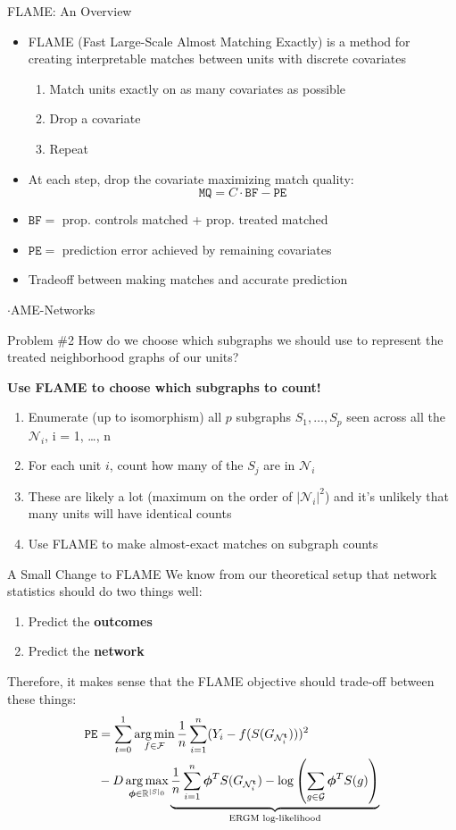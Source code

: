 \documentclass[newPxFont,numfooter,sectionpages]{beamer}
\DeclareMathOperator*{\argmin}{arg\,min}
\DeclareMathOperator*{\argmax}{arg\,max}
\newcommand{\bt}{\mathbf{t}}
\newcommand{\Gni}{G_{\mathcal{N}_i^\bt}}
\newcommand{\btheta}{\boldsymbol{\phi}}
\begin{document}
\begin{frame}{FLAME: An Overview}
	\begin{itemize}
		\item FLAME (Fast Large-Scale Almost Matching Exactly) is a method for creating interpretable matches between units with discrete covariates
		\begin{enumerate}
			\item Match units exactly on as many covariates as possible
			\item Drop a covariate
			\item Repeat
		\end{enumerate}
		\item At each step, drop the covariate maximizing match quality:
		\[\mathtt{MQ} = C \cdot \mathtt{BF} - \mathtt{PE}\]
		\item $\mathtt{BF} = $ prop. controls matched + prop. treated matched
		\item $\mathtt{PE} = $ prediction error achieved by remaining covariates
		\item Tradeoff between making matches and accurate prediction
	\end{itemize}
\end{frame}
\begin{frame}{$\cdot$AME-Networks}
\begin{alertblock}{Problem \#2}
How do we choose which subgraphs we should use to represent the treated neighborhood graphs of our units?
\end{alertblock}
\textbf{Use FLAME to choose which subgraphs to count!}
\begin{enumerate}
	\item Enumerate (up to isomorphism) all $p$ subgraphs $S_1, \dots, S_p$ seen across all the $\mathcal{N}_i$, i = 1, \dots, n
  \item For each unit $i$, count how many of the $S_j$ are in $\mathcal{N}_i$
  \item These are likely a lot (maximum on the order of $|\mathcal{N}_i|^2$) and it's unlikely that many units will have identical counts
  \item Use FLAME to make almost-exact matches on subgraph counts 
\end{enumerate}
\end{frame}
\begin{frame}{A Small Change to FLAME}
We know from our theoretical setup that network statistics should do two things well:
\begin{enumerate}
  \item Predict the \textbf{outcomes}
  \item Predict the \textbf{network}
\end{enumerate}
Therefore, it makes sense that the FLAME objective should trade-off between these things:
\begin{align*}
{\tt PE} &= \sum_{t = 0}^1\argmin_{f \in \mathcal{F}}\frac{1}{n}\sum_{i = 1}^n(Y_i - f(S(\Gni)))^2\\
         &- D\argmax_{\btheta \in \mathbb{R}^{|S|_0}}\underbrace{\frac{1}{n}\sum_{i=1}^n\btheta^TS(\Gni) - \log\left(\sum_{g \in \mathcal{G}} \btheta^TS(g)\right)}_{\text{ERGM log-likelihood}}
\end{align*}
\end{frame}
\end{document}
